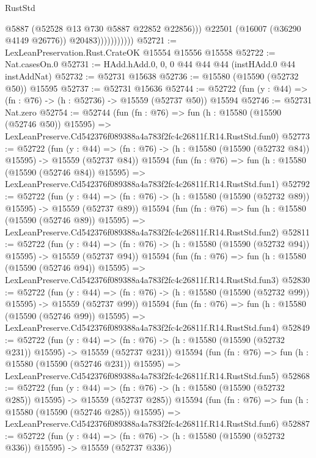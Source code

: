 \begin{lexlean}{RustStd}
\begin{coremodule}
                              @5887
                              (@52528 @13 @730 @5887 @22852 @22856)))
                          @22501
                          (@16007 (@36290 @4149 @26776))
                          @20483)))))))))))
@52721 := LexLeanPreservation.Rust.CrateOK @15554 @15556 @15558
@52722 := Nat.casesOn.{0}
@52731 := HAdd.hAdd.{0, 0, 0} @44 @44 @44 (instHAdd.{0} @44 instAddNat)
@52732 := @52731 @15638
@52736 := @15580 (@15590 (@52732 @50)) @15595
@52737 := @52731 @15636
@52744 := @52722 (fun (y : @44) => (fn : @76) -> (h : @52736) -> @15559 (@52737 @50)) @15594
@52746 := @52731 Nat.zero
@52754 := @52744
    (fun (fn : @76) =>
    fun (h : @15580 (@15590 (@52746 @50)) @15595) =>
    LexLeanPreserve.Cd542376f089388a4a783f2fc4c26811f.R14.RustStd.fun0)
@52773 := @52722
    (fun (y : @44) =>
    (fn : @76) -> (h : @15580 (@15590 (@52732 @84)) @15595) -> @15559 (@52737 @84))
    @15594
    (fun (fn : @76) =>
    fun (h : @15580 (@15590 (@52746 @84)) @15595) =>
    LexLeanPreserve.Cd542376f089388a4a783f2fc4c26811f.R14.RustStd.fun1)
@52792 := @52722
    (fun (y : @44) =>
    (fn : @76) -> (h : @15580 (@15590 (@52732 @89)) @15595) -> @15559 (@52737 @89))
    @15594
    (fun (fn : @76) =>
    fun (h : @15580 (@15590 (@52746 @89)) @15595) =>
    LexLeanPreserve.Cd542376f089388a4a783f2fc4c26811f.R14.RustStd.fun2)
@52811 := @52722
    (fun (y : @44) =>
    (fn : @76) -> (h : @15580 (@15590 (@52732 @94)) @15595) -> @15559 (@52737 @94))
    @15594
    (fun (fn : @76) =>
    fun (h : @15580 (@15590 (@52746 @94)) @15595) =>
    LexLeanPreserve.Cd542376f089388a4a783f2fc4c26811f.R14.RustStd.fun3)
@52830 := @52722
    (fun (y : @44) =>
    (fn : @76) -> (h : @15580 (@15590 (@52732 @99)) @15595) -> @15559 (@52737 @99))
    @15594
    (fun (fn : @76) =>
    fun (h : @15580 (@15590 (@52746 @99)) @15595) =>
    LexLeanPreserve.Cd542376f089388a4a783f2fc4c26811f.R14.RustStd.fun4)
@52849 := @52722
    (fun (y : @44) =>
    (fn : @76) -> (h : @15580 (@15590 (@52732 @231)) @15595) -> @15559 (@52737 @231))
    @15594
    (fun (fn : @76) =>
    fun (h : @15580 (@15590 (@52746 @231)) @15595) =>
    LexLeanPreserve.Cd542376f089388a4a783f2fc4c26811f.R14.RustStd.fun5)
@52868 := @52722
    (fun (y : @44) =>
    (fn : @76) -> (h : @15580 (@15590 (@52732 @285)) @15595) -> @15559 (@52737 @285))
    @15594
    (fun (fn : @76) =>
    fun (h : @15580 (@15590 (@52746 @285)) @15595) =>
    LexLeanPreserve.Cd542376f089388a4a783f2fc4c26811f.R14.RustStd.fun6)
@52887 := @52722
    (fun (y : @44) =>
    (fn : @76) -> (h : @15580 (@15590 (@52732 @336)) @15595) -> @15559 (@52737 @336))

\end{coremodule}
\end{lexlean}
